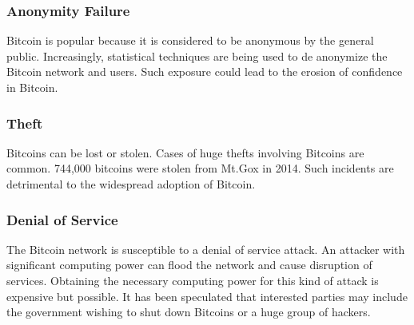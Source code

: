 \subsubsection{Anonymity Failure}
Bitcoin is popular because it is considered to be anonymous by the general public. Increasingly, statistical techniques are being used to de anonymize the Bitcoin network and users. Such exposure could lead to the erosion of confidence in Bitcoin.

\subsubsection{Theft}
Bitcoins can be lost or stolen. Cases of huge thefts involving Bitcoins are common. 744,000 bitcoins were stolen from Mt.Gox in 2014. Such incidents are detrimental to the widespread adoption of Bitcoin.

\subsubsection{Denial of Service}
The Bitcoin network is susceptible to a denial of service attack. An attacker with significant computing power can flood the network and cause disruption of services. Obtaining the necessary computing power for this kind of attack is expensive but possible. It has been speculated that interested parties may include the government wishing to shut down Bitcoins or a huge group of hackers.














